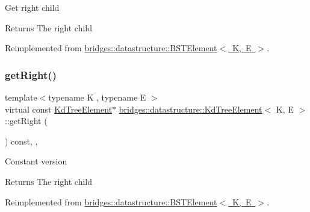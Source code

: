 Get right child \begin{DoxyReturn}{Returns}
The right child 
\end{DoxyReturn}


Reimplemented from \mbox{\hyperlink{classbridges_1_1datastructure_1_1_b_s_t_element_a80f5085d6d03805dd3091b7693d8e235}{bridges\+::datastructure\+::\+B\+S\+T\+Element$<$ K, E $>$}}.

\mbox{\label{classbridges_1_1datastructure_1_1_kd_tree_element_ae8d6007d3848b72cbfc11d2e29120781}} 
\subsubsection{\texorpdfstring{getRight()}{getRight()}\hspace{0.1cm}{\footnotesize\ttfamily [2/2]}}
{\footnotesize\ttfamily template$<$typename K , typename E $>$ \\
virtual const \mbox{\hyperlink{classbridges_1_1datastructure_1_1_kd_tree_element}{Kd\+Tree\+Element}}$\ast$ \mbox{\hyperlink{classbridges_1_1datastructure_1_1_kd_tree_element}{bridges\+::datastructure\+::\+Kd\+Tree\+Element}}$<$ K, E $>$\+::get\+Right (\begin{DoxyParamCaption}{ }\end{DoxyParamCaption}) const\hspace{0.3cm}{\ttfamily [inline]}, {\ttfamily [override]}, {\ttfamily [virtual]}}

Constant version

\begin{DoxyReturn}{Returns}
The right child 
\end{DoxyReturn}


Reimplemented from \mbox{\hyperlink{classbridges_1_1datastructure_1_1_b_s_t_element_a012f0eb09c3d62b14c73109e6ded0879}{bridges\+::datastructure\+::\+B\+S\+T\+Element$<$ K, E $>$}}.

\mbox{\label{classbridges_1_1datastructure_1_1_kd_tree_element_a9862bde7b85254224963e23dd9bcee29}} 

